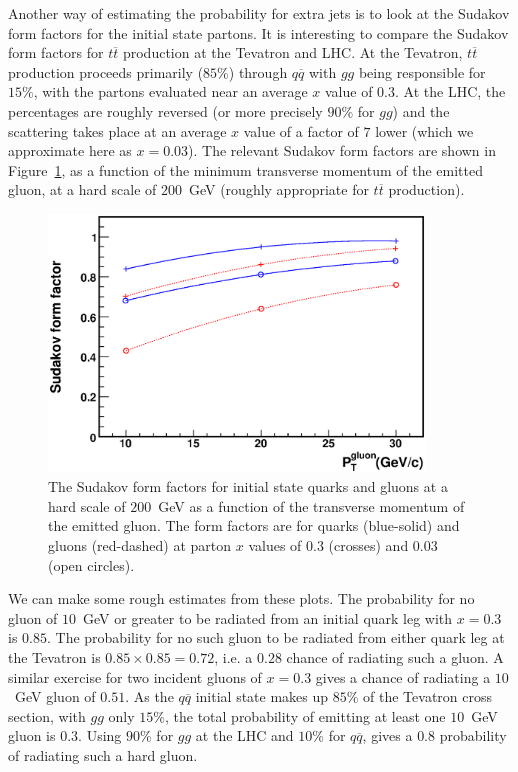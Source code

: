 \documentclass[12pt]{iopart}
\begin{document}
Another way of estimating the probability for extra jets is to look at the Sudakov form factors for the initial state partons. 
It is interesting to 
compare the Sudakov form factors for $t\overline{t}$ production at the Tevatron and  LHC. At the Tevatron,
$t\overline{t}$ production proceeds primarily ($85\%$) through $q\overline{q}$ with  $gg$ being responsible for
$15\%$, with the partons evaluated near an average $x$ value of $0.3$. At the LHC, the percentages are roughly reversed
(or more precisely $90\%$ for $gg$) and the scattering takes place at an average $x$ value of a factor of $7$
lower (which we approximate here  as $x=0.03$). The relevant Sudakov form factors are shown in
Figure~\ref{fig:sudakov_tT}, as a function of the minimum transverse momentum of the emitted gluon, at a hard scale of
$200$~GeV (roughly appropriate for $t\overline{t}$ production).
%
\begin{figure}[t]
\begin{center}
\includegraphics[width=10cm]{sudakov_tT.eps}
\end{center}
\vspace*{-0.5cm}
\caption{
The Sudakov form factors for initial state quarks and gluons at a hard scale of $200$~GeV as a function of the
transverse momentum of the emitted gluon. The form factors are for quarks (blue-solid) and gluons (red-dashed)
at parton $x$ values of $0.3$ (crosses) and $0.03$ (open circles).
} 
\label{fig:sudakov_tT}
\end{figure}
%
We
can make some rough estimates from these plots. The probability for no gluon of $10$~GeV or greater to be radiated from an
initial quark leg with $x=0.3$ is $0.85$. The probability for no such gluon to be radiated from either quark leg at the
Tevatron is $0.85 \times 0.85=0.72$, i.e. a $0.28$ chance of radiating such a gluon. A similar exercise for two incident
gluons of $x=0.3$ gives a chance of radiating a $10$~GeV gluon of $0.51$. As the $q\overline{q}$ initial state makes up
$85\%$ of the Tevatron cross section, with $gg$ only $15\%$, the total probability of emitting at least one $10$~GeV gluon
is $0.3$. Using $90\%$ for $gg$ at the LHC and $10\%$ for $q\overline{q}$, gives a $0.8$ probability of radiating such a hard
gluon.
\end{document}
